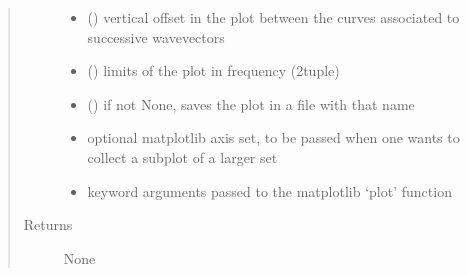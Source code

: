 \documentclass[letterpaper,10pt,english]{sphinxmanual}
\begin{document}
\begin{fulllineitems}
\begin{quote}
\begin{description}
\begin{itemize}
\item {} 
\sphinxAtStartPar
{} () \textendash{} vertical offset in the plot between the curves associated to successive wavevectors

\item {} 
\sphinxAtStartPar
{} (\sphinxstyleliteralemphasis{\sphinxupquote{(}}\sphinxstyleliteralemphasis{\sphinxupquote{,}}\sphinxstyleliteralemphasis{\sphinxupquote{)}}) \textendash{} limits of the plot in frequency (2\sphinxhyphen{}tuple)

\item {} 
\sphinxAtStartPar
{} () \textendash{} if not None, saves the plot in a file with that name

\item {} 
\sphinxAtStartPar
{} \textendash{} optional matplotlib axis set, to be passed when one wants to collect a subplot of a larger set

\item {} 
\sphinxAtStartPar
{} \textendash{} keyword arguments passed to the matplotlib ‘plot’ function

\end{itemize}

\item[{Returns}] \leavevmode
\sphinxAtStartPar
None

\end{description}\end{quote}

\end{fulllineitems}

\end{document}
